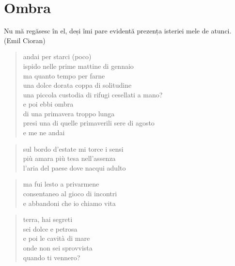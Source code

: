 \chapter*{Ombra}

\begin{otherlanguage}{romanian}
    Nu mă regăsesc în el, deşi îmi pare evidentă prezenţa isteriei mele de atunci. (Emil Cioran)
\end{otherlanguage}


\begin{verse}
    andai per starci (poco)\\
    ispido nelle prime mattine di gennaio\\
    ma quanto tempo per farne\\
    una dolce dorata coppa di solitudine\\
    una piccola custodia di rifugi cesellati a mano?\\
    e poi ebbi ombra\\
    di una primavera troppo lunga\\
    presi una di quelle primaverili sere di agosto\\
    e me ne andai
\end{verse}

\clearpage


\begin{verse}
    sul bordo d'estate mi torce i sensi\\
    più amara più tesa nell'assenza\\
    l'aria del paese dove nacqui adulto
\end{verse}

\begin{verse}
    ma fui lesto a privarmene\\
    consentaneo al gioco di incontri\\
    e abbandoni che io chiamo vita
\end{verse}

\clearpage


\begin{verse}
    terra, hai segreti\\
    sei dolce e petrosa\\
    e poi le cavità di mare\\
    onde non sei sprovvista\\
    quando ti vennero?
\end{verse}

